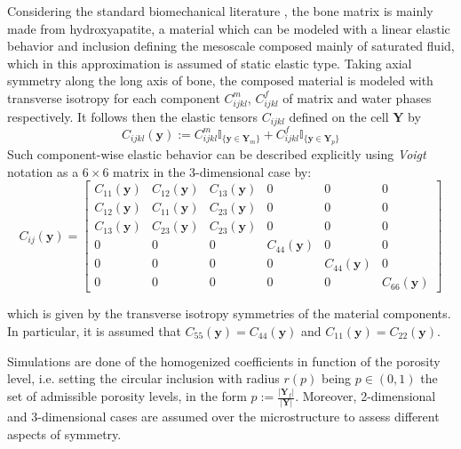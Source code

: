 Considering the standard biomechanical literature \cite{Foiret2014}, the bone matrix is mainly made from hydroxyapatite, a material which can be modeled with a linear elastic behavior and inclusion defining the mesoscale composed mainly of saturated fluid, which in this approximation is assumed of static elastic type. Taking axial symmetry along the long axis of bone, the composed material is modeled with transverse isotropy for each component $C^m_{ijkl}$, $C^f_{ijkl}$ of matrix and water phases respectively.
It follows then the elastic tensors $C_{ijkl}$ defined on the cell $\mathbf{Y}$ by
\begin{equation*}
    C_{ijkl} (\mathbf{y}) := C^m_{ijkl} \mathbb{I}_{\{\mathbf{y} \in  \mathbf{Y}_{m}\}} + C^f_{ijkl} \mathbb{I}_{\{ \mathbf{y} \in \mathbf{Y}_{p}\}}
\end{equation*}
Such component-wise elastic behavior can be described explicitly using \textit{Voigt} notation as a $6\times 6$ matrix in the 3-dimensional case by:
\begin{equation*}
    C_{ij}(\mathbf{y}) = 
    \begin{bmatrix}
    C_{11}(\mathbf{y}) & C_{12}(\mathbf{y}) & C_{13}(\mathbf{y}) & 0 & 0 & 0 \\
    C_{12}(\mathbf{y}) & C_{11}(\mathbf{y}) & C_{23}(\mathbf{y}) & 0 & 0 & 0 \\
    C_{13}(\mathbf{y}) & C_{23}(\mathbf{y}) & C_{23}(\mathbf{y}) & 0 & 0 & 0 \\
    0 & 0 & 0 & C_{44}(\mathbf{y}) & 0 & 0 \\
    0 & 0 & 0 & 0 & C_{44}(\mathbf{y}) & 0 \\
    0 & 0 & 0 & 0 & 0 & C_{66}(\mathbf{y}) 
    \end{bmatrix}
\end{equation*}

which is given by the transverse isotropy symmetries of the material components. In particular, it is assumed that $C_{55}(\mathbf{y}) = C_{44}(\mathbf{y})$ and $C_{11}(\mathbf{y}) = C_{22}(\mathbf{y})$.

Simulations are done of the homogenized coefficients in function of the porosity level, i.e. setting the circular inclusion with radius $r(p)$ being $p \in (0,1)$ the set of admissible porosity levels, in the form $ p := \frac{\vert \mathbf{Y}_f \vert }{\vert \mathbf{Y}\vert} $. Moreover, 2-dimensional and 3-dimensional cases are assumed over the microstructure to assess different aspects of symmetry.

